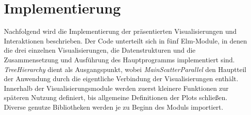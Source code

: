\documentclass[usegeometry=true]{scrartcl}
\begin{document}

\section{Implementierung}
Nachfolgend wird die Implementierung der präsentierten Visualisierungen und Interaktionen beschrieben. 
Der Code unterteilt sich in fünf Elm-Module, in denen die drei einzelnen Visualisierungen, die Datenstrukturen 
und die Zusammensetzung und Ausführung des Hauptprogramms implementiert sind. 
\textit{TreeHierarchy} dient als Ausgangspunkt, wobei \textit{MainScatterParallel} den Hauptteil der Anwendung durch die eigentliche Verbindung 
der Visualisierungen enthält.
Innerhalb der Visualisierungsmodule werden zuerst kleinere Funktionen zur späteren Nutzung definiert, 
bis allgemeine Definitionen der Plots schließen. 
Diverse genutze Bibliotheken werden je zu Beginn des Moduls importiert.
           
\end{document}
